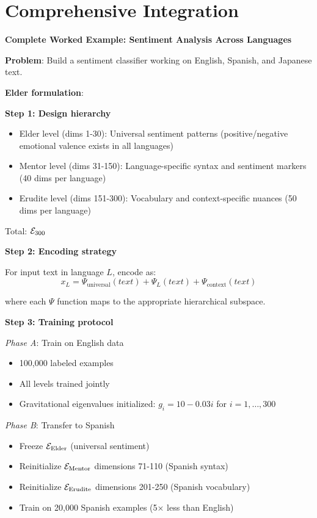 \section{Comprehensive Integration}

\begin{application}
\textbf{Complete Worked Example: Sentiment Analysis Across Languages}

\textbf{Problem}: Build a sentiment classifier working on English, Spanish, and Japanese text.

\textbf{Elder formulation}:

\textbf{Step 1: Design hierarchy}
\begin{itemize}
\item Elder level (dims 1-30): Universal sentiment patterns (positive/negative emotional valence exists in all languages)
\item Mentor level (dims 31-150): Language-specific syntax and sentiment markers (40 dims per language)
\item Erudite level (dims 151-300): Vocabulary and context-specific nuances (50 dims per language)
\end{itemize}

Total: $\mathcal{E}_{300}$

\textbf{Step 2: Encoding strategy}

For input text in language $L$, encode as:
$$x_L = \Psi_{\text{universal}}(text) + \Psi_{L}(text) + \Psi_{\text{context}}(text)$$

where each $\Psi$ function maps to the appropriate hierarchical subspace.

\textbf{Step 3: Training protocol}

\textit{Phase A}: Train on English data
\begin{itemize}
\item 100,000 labeled examples
\item All levels trained jointly
\item Gravitational eigenvalues initialized: $g_i = 10 - 0.03i$ for $i=1,\ldots,300$
\end{itemize}

\textit{Phase B}: Transfer to Spanish
\begin{itemize}
\item Freeze $\mathcal{E}_{\text{Elder}}$ (universal sentiment)
\item Reinitialize $\mathcal{E}_{\text{Mentor}}$ dimensions 71-110 (Spanish syntax)
\item Reinitialize $\mathcal{E}_{\text{Erudite}}$ dimensions 201-250 (Spanish vocabulary)
\item Train on 20,000 Spanish examples (5× less than English)
\end{itemize}


\end{application}
